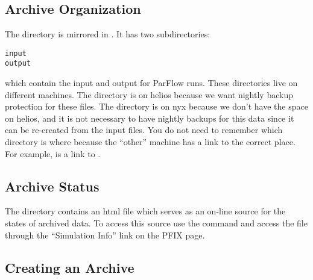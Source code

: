\subsection{Archive Organization}
\label{Archive Organization}

The directory  is mirrored in
.  It has two subdirectories:
\begin{display}\begin{verbatim}
input
output
\end{verbatim}\end{display}
which contain the input and output for ParFlow runs.  These
directories live on different machines.  The  directory is
on helios because we want nightly backup protection for these files.
The  directory is on nyx because we don't have the space on
helios, and it is not necessary to have nightly backups for this data
since it can be re-created from the input files.  You do not need
to remember which directory is where because the ``other'' machine
has a link to the correct place.  For example, 
is a link to .


\subsection{Archive Status}
\label{Archive Status}

The directory  contains an html file 
which serves as an on-line source for the states of archived data.  To
access this source use the  command and access the file
 through the ``Simulation Info'' link on the PFIX page.


\subsection{Creating an Archive}
\label{Creating an Archive}

